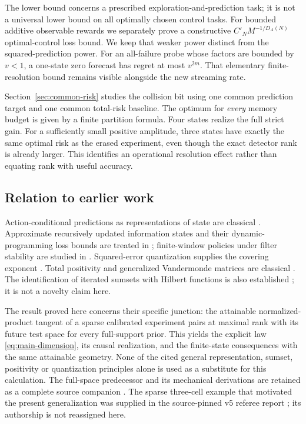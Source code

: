 The lower bound concerns a prescribed exploration-and-prediction task;
it is not a universal lower bound on all optimally chosen control tasks.
For bounded additive observable rewards we separately prove a constructive
$C'_NM^{-1/D_A(N)}$ optimal-control loss bound. We keep that weaker
power distinct from the squared-prediction power. For an all-failure probe
whose factors are bounded by $v<1$, a one-state zero forecast has regret
at most $v^{2m}$. That elementary finite-resolution bound remains visible
alongside the new streaming rate.

Section~\ref{sec:common-risk} studies the collision bit using one common
prediction target and one common total-risk baseline. The optimum for
\emph{every} memory budget is given by a finite partition formula. Four
states realize the full strict gain. For a sufficiently small positive
amplitude, three states have exactly the same optimal risk as the erased
experiment, even though the exact detector rank is already larger. This
identifies an operational resolution effect rather than equating rank with
useful accuracy.

\subsection{Relation to earlier work}
Action-conditional predictions as representations of state are classical
\cite{LittmanSutton}. Approximate recursively updated information states
and their dynamic-programming loss bounds are treated in
\cite{Subramanian}; finite-window policies under filter stability are
studied in \cite{KaraYuksel}. Squared-error quantization supplies the
covering exponent \cite{GrafLuschgy}. Total positivity and generalized
Vandermonde matrices are classical \cite{Pinkus}. The identification of
iterated sumsets with Hilbert functions is also established
\cite{EliahouMazumdar,Elias}; it is not a novelty claim here.

The result proved here concerns their specific junction: the attainable
normalized-product tangent of a sparse calibrated experiment pairs at
maximal rank with its future test space for every full-support prior.
This yields the explicit law \eqref{eq:main-dimension}, its causal
realization, and the finite-state consequences with the same attainable
geometry. None of the cited general representation, sumset, positivity or
quantization principles alone is used as a substitute for this calculation.
The full-space predecessor and its mechanical derivations are retained
as a complete source companion \cite{A1v5}. The sparse three-cell example
that motivated the present generalization was supplied in the source-pinned
v5 referee report \cite{A1review}; its authorship is not reassigned here.
